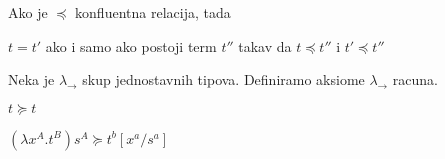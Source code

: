 \begin{teorem}
  Ako je $\preceq$ konfluentna relacija, tada
  \begin{center}
    $t = t'$ ako i samo ako postoji term $t''$ takav da $t \preceq t''$ i $t' \preceq t''$
  \end{center}
\end{teorem}

\begin{definition}
  Neka je $\lambda_\to$ skup jednostavnih tipova. Definiramo aksiome $\lambda_\to$ racuna.
  \begin{enumerate*}
  
  \item \begin{center}$t \succeq t$\end{center}

  \item \begin{center}$(\lambda x^A . t ^B)s^A \succeq t^b [x^a / s^a]$\end{center}

  \item  \begin{prooftree}
    \end{prooftree}

  \item
    \begin{prooftree}
    \end{prooftree}

  \item
    \begin{prooftree}
    \end{prooftree}

  \item
    \begin{prooftree}
    \end{prooftree}


  \item
    \begin{prooftree}
    \end{prooftree}

  \item
    \begin{prooftree}
    \end{prooftree}

  \item
    \begin{prooftree}
    \end{prooftree}

  \end{enumerate*}
\end{definition}


